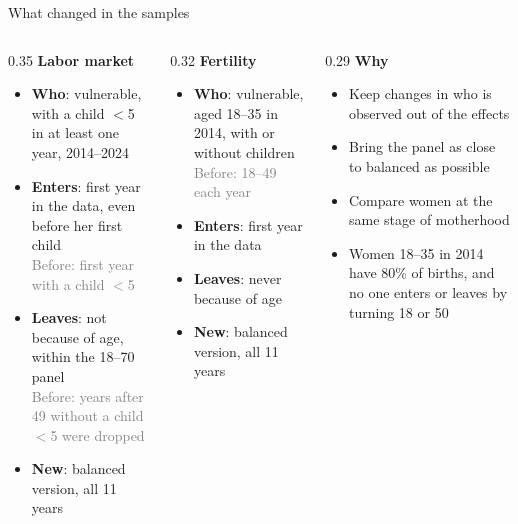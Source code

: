 \documentclass[aspectratio=169,10pt]{beamer}
\newcommand{\takeaway}[1]{\par\vspace{6pt}{\small\textcolor{steel}{$\Rightarrow$}\ \textbf{\textcolor{navy}{#1}}}}
\begin{document}
\begin{frame}{What changed in the samples}
\begin{columns}[T]
\begin{column}{0.35\textwidth}
{\small\textcolor{steel}{\textbf{Labor market}}}
\begin{itemize}
  \footnotesize
  \item \textbf{Who}: vulnerable, with a child $<$5 in at least one year, 2014--2024
  \item \textbf{Enters}: first year in the data, even before her first child \\ \textcolor{graytext}{Before: first year with a child $<$5}
  \item \textbf{Leaves}: not because of age, within the 18--70 panel \\ \textcolor{graytext}{Before: years after 49 without a child $<$5 were dropped}
  \item \textbf{New}: balanced version, all 11 years
\end{itemize}
\end{column}
\begin{column}{0.32\textwidth}
{\small\textcolor{steel}{\textbf{Fertility}}}
\begin{itemize}
  \footnotesize
  \item \textbf{Who}: vulnerable, aged 18--35 in 2014, with or without children \\ \textcolor{graytext}{Before: 18--49 each year}
  \item \textbf{Enters}: first year in the data
  \item \textbf{Leaves}: never because of age
  \item \textbf{New}: balanced version, all 11 years
\end{itemize}
\end{column}
\begin{column}{0.29\textwidth}
{\small\textcolor{steel}{\textbf{Why}}}
\begin{itemize}
  \footnotesize
  \item Keep changes in who is observed out of the effects
  \item Bring the panel as close to balanced as possible
  \item Compare women at the same stage of motherhood
  \item Women 18--35 in 2014 have 80\% of births, and no one enters or leaves by turning 18 or 50
\end{itemize}
\end{column}
\end{columns}
\takeaway{We follow the same women for longer, so composition weighs less on the estimates.}
\end{frame}
\end{document}

